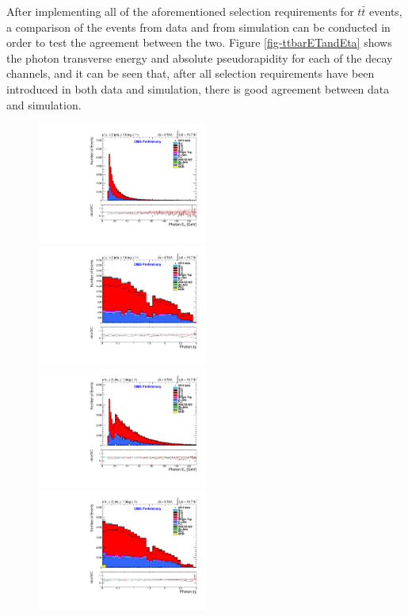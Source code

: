 After implementing all of the aforementioned selection requirements for $t\bar{t}$ events, a comparison of the events from data and from simulation can be conducted in order to test the agreement between the two. Figure \ref{fig-ttbarETandEta} shows the photon transverse energy and absolute pseudorapidity for each of the decay channels, and it can be seen that, after all selection requirements have been introduced in both data and simulation, there is good agreement between data and simulation. 

\begin{figure}
\includegraphics[width=0.5\textwidth]{Plots/ControlPlots/TTbarDiLeptonAnalysis/MuMu/Photons/AllPhotons/Photon_ET_splitTTbar_ratio.pdf}
\includegraphics[width=0.5\textwidth]{Plots/ControlPlots/TTbarDiLeptonAnalysis/MuMu/Photons/AllPhotons/Photon_AbsEta_splitTTbar_ratio.pdf}\\
\includegraphics[width=0.5\textwidth]{Plots/ControlPlots/TTbarDiLeptonAnalysis/EE/Photons/AllPhotons/Photon_ET_splitTTbar_ratio.pdf}
\includegraphics[width=0.5\textwidth]{Plots/ControlPlots/TTbarDiLeptonAnalysis/EE/Photons/AllPhotons/Photon_AbsEta_splitTTbar_ratio.pdf}\\

\end{figure}
